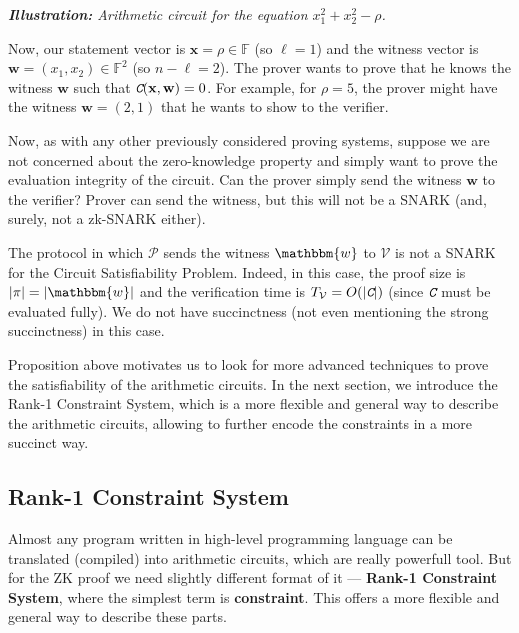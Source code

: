 \documentclass[../../book.tex]{subfiles}
\begin{document}
\begin{example}
\begin{center}
        \textit{\textbf{Illustration:} Arithmetic circuit for the equation $x_1^2 + x_2^2 - \rho$.}
    \end{center}

    Now, our statement vector is $\mathbf{x} = \rho \in \mathbb{F}$ (so
    $\ell=1$) and the witness vector is $\mathbf{w} = (x_1,x_2) \in
    \mathbb{F}^2$ (so $n-\ell=2$). The prover wants to prove that he knows the
    witness $\mathbf{w}$ such that $\textit{\texttt{C}}(\mathbf{x},\mathbf{w}) = 0$. For
    example, for $\rho=5$, the prover might have the witness $\mathbf{w} =
    (2,1)$ that he wants to show to the verifier.
\end{example}

Now, as with any other previously considered proving systems, suppose we are not concerned about the zero-knowledge property and simply want to prove the evaluation integrity of the circuit. Can the prover simply send the witness $\mathbf{w}$ to the verifier? Prover can send the witness, but this will not be a SNARK (and, surely, not a zk-SNARK either). 

\begin{proposition}
    The protocol in which $\mathcal{P}$ sends the witness $\mathbbm{w}$ to
    $\mathcal{V}$ is not a SNARK for the Circuit Satisfiability Problem. Indeed,
    in this case, the proof size is $|\pi| = |\mathbbm{w}|$ and the verification
    time is $T_{\mathcal{V}} = O(|\textit{\texttt{C}}|)$ (since $\textit{\texttt{C}}$ must be evaluated
    fully). We do not have succinctness (not even mentioning the strong
    succinctness) in this case.
\end{proposition}

Proposition above motivates us to look for more advanced techniques to prove the satisfiability of the arithmetic circuits. In the next section, we introduce the Rank-1 Constraint System, which is a more flexible and general way to describe the arithmetic circuits, allowing to further encode the constraints in a more succinct way.

\subsection{Rank-1 Constraint System}

Almost any program written in high-level programming language can be translated (compiled) into
arithmetic circuits, which are really powerfull tool. But for the ZK proof we need slightly different
format of it --- \textbf{Rank-1 Constraint System}, where the simplest term is \textbf{constraint}. 
This offers a more flexible and general way to describe these parts.
\end{document}
